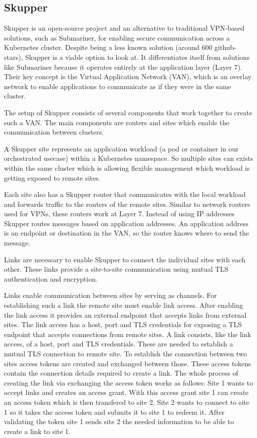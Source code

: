 %
\subsection{Skupper}
%
Skupper is an open-source project and an alternative to traditional VPN-based solutions, such as Submariner, for enabling secure communication across a Kubernetes cluster.
Despite being a less known solution (around 600 github-stars), Skupper is a viable option to look at.
It differentiates itself from solutions like Submariner because it operates entirely at the application layer (Layer 7).
Their key concept is the Virtual Application Network (VAN), which is an overlay network to enable applications to communicate as if they were in the same cluster.

The setup of Skupper consists of several components that work together to create such a VAN. The main components are routers and sites which enable the communication between clusters.

A Skupper site represents an application workload (a pod or container in our orchestrated usecase) within a Kubernetes namespace.
So multiple sites can exists within the same cluster which is allowing flexible management which workload is getting exposed to remote sites.

Each site also has a Skupper router that communicates with the local workload and forwards traffic to the routers of the remote sites.
Similar to network routers used for VPNs, these routers work at Layer 7.
Instead of using IP addresses Skupper routes messages based on application addresses.
An application address is an endpoint or destination in the VAN, so the router knows where to send the message.

Links are necessary to enable Skupper to connect the individual sites with each other.
These links provide a site-to-site communication using mutual TLS authentication and encryption.



Links enable communication between sites by serving as channels.
For establishing such a link the remote site must enable link access.
After enabling the link access it provides an external endpoint that accepts links from external sites.
The link access has a host, port and TLS credentials for exposing a TLS endpoint that accepts connections from remote sites.
A link consists, like the link access, of a host, port and TLS credentials.
These are needed to establish a mutual TLS connection to remote site. 
To establish the connection between two sites access tokens are created and exchanged between those.
These access tokens contain the connection details required to create a link.
The whole process of creating the link via exchanging the access token works as follows:
Site 1 wants to accept links and creates an access grant.
With this access grant site 1 can create an access token which is then transfered to site 2.
Site 2 wants to connect to site 1 so it takes the access token and submits it to site 1 to redeem it.
After validating the token site 1 sends site 2 the needed information to be able to create a link to site 1.

